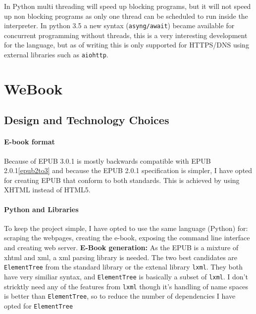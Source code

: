 \documentclass[]{report}   %
\begin{document}
In Python multi threading will speed up blocking programs, but it will not
speed up non blocking programs as only one thread can be scheduled to run
inside the interpreter. In python 3.5 a new syntax (\texttt{asyng/await})
became available for concurrent programming without threads, this is a very
interesting development for the language, but as of writing this is only
supported for HTTPS/DNS using external libraries such as \texttt{aiohttp}. 


\chapter{WeBook}

\section{Design and Technology Choices}
\subsubsection{E-book format}
Because of EPUB 3.0.1 is mostly backwards compatible with EPUB
2.0.1\ref{epub2to3} and because the EPUB 2.0.1 specification is simpler, I have
opted for creating EPUB that conform to both standards. This is achieved by
using XHTML instead of HTML5.

\subsubsection{Python and Libraries}
To keep the project simple, I have opted to use the same language (Python) for:
scraping the webpages, creating the e-book, exposing the command line
interface and creating web server.
\textbf{E-Book generation:} As the EPUB is a mixture of xhtml and xml, a xml
parsing library is needed. The two best candidates are \texttt{ElementTree}
from the standard library or the extenal library \texttt{lxml}. They both have
very similiar syntax, and \texttt{ElementTree} is basically a subset of
\texttt{lxml}. I don't stricktly need any of the features from \texttt{lxml}
though it's handling of name spaces is better than \texttt{ElementTree}, so to
reduce the number of dependencies I have opted for \texttt{ElementTree}
\end{document}
